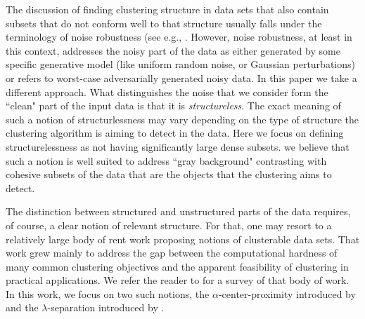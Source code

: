 \documentclass[anon,12pt]{colt2016} %
\begin{document}
The discussion of finding clustering structure in data sets that also contain subsets that do not conform well to that structure usually falls under the terminology of noise robustness (see e.g., \cite{balcan2012clustering, ackerman2009clusterability, ackerman2009clusterability,
cuesta1997trimmed, dave1993robust, garcia2008general}. However, noise robustness, at least in this context, addresses the noisy part of the data as either generated by some specific generative model (like uniform random noise, or Gaussian perturbations) or refers to worst-case adversarially generated noisy data. In this paper we take a different approach. What distinguishes the noise that we consider form the ``clean" part of the input data is that it is \emph{structureless}. The exact meaning of such a notion of structurlessness may vary depending on the type of structure the clustering algorithm is aiming to detect in the data. Here we focus on
defining structurelessness as  not having significantly large dense subsets. we believe that such a notion is well suited to address ``gray background" contrasting with cohesive subsets of the data that are the objects that the clustering aims to detect. 

The distinction between structured and unstructured parts of the data requires, of course, a clear notion of relevant structure. For that, one may resort to a relatively large body of rent work proposing notions of clusterable data sets. That work grew mainly to address the gap between the computational hardness of many common clustering 
objectives and the apparent feasibility of clustering in practical applications. We refer the reader to \cite{ashtiani2015representation} for a survey of that body of work.
In this work, we focus on two such notions, the $\alpha$-center-proximity introduced by \cite{awasthi2012center} and the $\lambda$-separation introduced by \cite{ben2014clustering}.
\end{document}
